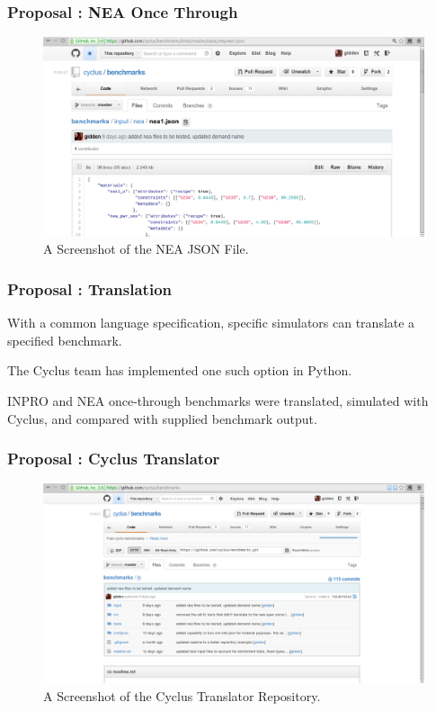 \begin{frame}
  \frametitle{Proposal : NEA Once Through}
  \begin{figure}
    \includegraphics[width=\linewidth, height=\textheight, keepaspectratio]{nea.eps}
    \caption{A Screenshot of the NEA JSON File.}
  \end{figure}
\end{frame}

\begin{frame}
  \frametitle{Proposal : Translation} 
  With a common language specification, specific simulators can translate a
  specified benchmark.

  \vspace{0.4cm}

  The Cyclus team has implemented one such option in Python.

  \vspace{0.4cm}

  INPRO and NEA once-through benchmarks were translated, simulated with Cyclus,
  and compared with supplied benchmark output.
\end{frame}

\begin{frame}
  \frametitle{Proposal : Cyclus Translator}
  \begin{figure}
    \includegraphics[width=\linewidth, height=\textheight, keepaspectratio]{benchmarks.eps}
    \caption{A Screenshot of the Cyclus Translator Repository.}
  \end{figure}
\end{frame}

